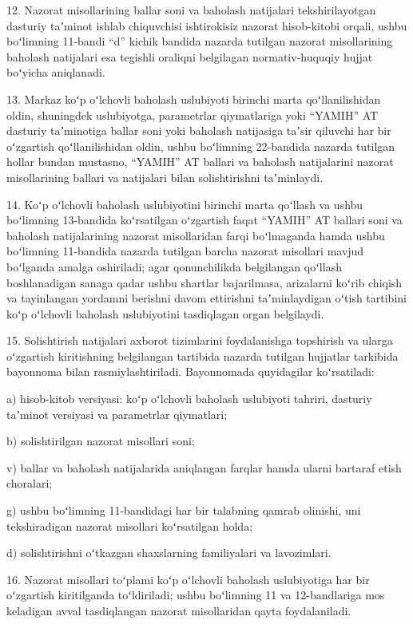 \documentclass[14pt,a4paper]{extarticle}
\newcommand{\norm}[1]{\par\noindent\hspace*{1.27cm}#1. }
\newcommand{\sub}[1]{\par\noindent\hspace*{1.27cm}#1 }
\begin{document}
\norm{12}Nazorat misollarining ballar soni va baholash natijalari tekshirilayotgan dasturiy taʼminot ishlab chiquvchisi ishtirokisiz nazorat hisob-kitobi orqali, ushbu boʻlimning 11-bandi “d” kichik bandida nazarda tutilgan nazorat misollarining baholash natijalari esa tegishli oraliqni belgilagan normativ-huquqiy hujjat boʻyicha aniqlanadi.

\norm{13}Markaz koʻp oʻlchovli baholash uslubiyoti birinchi marta qoʻllanilishidan oldin, shuningdek uslubiyotga, parametrlar qiymatlariga yoki “YAMIH” AT dasturiy taʼminotiga ballar soni yoki baholash natijasiga taʼsir qiluvchi har bir oʻzgartish qoʻllanilishidan oldin, ushbu boʻlimning 22-bandida nazarda tutilgan hollar bundan mustasno, “YAMIH” AT ballari va baholash natijalarini nazorat misollarining ballari va natijalari bilan solishtirishni taʼminlaydi.

\norm{14}Koʻp oʻlchovli baholash uslubiyotini birinchi marta qoʻllash va ushbu boʻlimning 13-bandida koʻrsatilgan oʻzgartish faqat “YAMIH” AT ballari soni va baholash natijalarining nazorat misollaridan farqi boʻlmaganda hamda ushbu boʻlimning 11-bandida nazarda tutilgan barcha nazorat misollari mavjud boʻlganda amalga oshiriladi; agar qonunchilikda belgilangan qoʻllash boshlanadigan sanaga qadar ushbu shartlar bajarilmasa, arizalarni koʻrib chiqish va tayinlangan yordamni berishni davom ettirishni taʼminlaydigan oʻtish tartibini koʻp oʻlchovli baholash uslubiyotini tasdiqlagan organ belgilaydi.

\norm{15}Solishtirish natijalari axborot tizimlarini foydalanishga topshirish va ularga oʻzgartish kiritishning belgilangan tartibida nazarda tutilgan hujjatlar tarkibida bayonnoma bilan rasmiylashtiriladi. Bayonnomada quyidagilar koʻrsatiladi:
\sub{a)}hisob-kitob versiyasi: koʻp oʻlchovli baholash uslubiyoti tahriri, dasturiy taʼminot versiyasi va parametrlar qiymatlari;
\sub{b)}solishtirilgan nazorat misollari soni;
\sub{v)}ballar va baholash natijalarida aniqlangan farqlar hamda ularni bartaraf etish choralari;
\sub{g)}ushbu boʻlimning 11-bandidagi har bir talabning qamrab olinishi, uni tekshiradigan nazorat misollari koʻrsatilgan holda;
\sub{d)}solishtirishni oʻtkazgan shaxslarning familiyalari va lavozimlari.

\norm{16}Nazorat misollari toʻplami koʻp oʻlchovli baholash uslubiyotiga har bir oʻzgartish kiritilganda toʻldiriladi; ushbu boʻlimning 11 va 12-bandlariga mos keladigan avval tasdiqlangan nazorat misollaridan qayta foydalaniladi.
\end{document}
